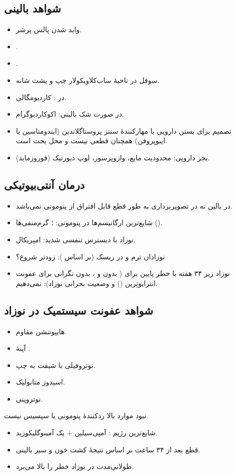 \documentclass[12pt,a4paper]{article}
\begin{document}
\subsection*{شواهد بالینی }
\begin{itemize}
\item واید شدن پالس پرشر.
\item {}.
\item {}.
\item سوفل در ناحیهٔ ساب‌کلاویکولار چپ و پشت شانه.
\item در : کاردیومگالی.
\item در صورت شک بالینی: اکوکاردیوگرام.
\item تصمیم برای بستن دارویی  با مهارکنندهٔ سنتز پروستاگلاندین (ایندومتاسین یا ایبوپروفن) همچنان قطعی نیست و محل بحث است.
\item بجز دارویی: محدودیت مایع، وازوپرسور، لوپ دیورتیک (فوروزماید).
\end{itemize}

\subsection*{درمان آنتی‌بیوتیکی}
\begin{itemize}
\item {} در بالین نه در تصویربرداری به طور قطع قابل افتراق از پنومونی نمی‌باشد.
\item شایع‌ترین ارگانیسم‌ها در پنومونی: ؛ گرم‌منفی‌ها ().
\item نوزاد با دیسترس تنفسی شدید:  امپریکال.
\item نوزادان ترم و  در ریسک  (بر اساس ): زودتر  شروع؟
\item نوزاد زیر ۳۴ هفته با خطر پایین برای  ( بدون  و ، بدون نگرانی برای عفونت انترا‌یوتِرین () و وضعیت بحرانی نوزاد):  نمی‌دهیم.
\end{itemize}
\subsection*{شواهد عفونت سیستمیک در نوزاد}
\begin{itemize}
\item هایپوتنشن مقاوم.
\item آپنهٔ .
\item نوتروفیلی با شیفت به چپ.
\item اسیدوز متابولیک.
\item نوتروپنی.
\end{itemize}
نبود موارد بالا ردکنندهٔ پنومونی یا سپسیس نیست.
\begin{itemize}
\item شایع‌ترین رژیم : آمپی‌سیلین + یک آمینوگلیکوزید.
\item قطع بعد از ۳۴ ساعت بر اساس نتیجهٔ کشت خون و سیر بالینی. 
\item {} طولانی‌مدت در نوزاد خطر  را بالا می‌برد.
\end{itemize}
\end{document}
